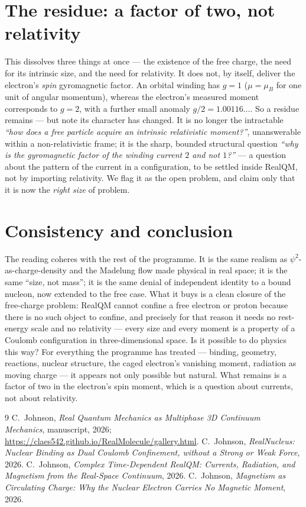 \documentclass[11pt]{article}
\begin{document}
\section{The residue: a factor of two, not relativity}
\label{sec:residue}

This dissolves three things at once --- the existence of the free charge, the need for its intrinsic size,
and the need for relativity. It does not, by itself, deliver the electron's \emph{spin} gyromagnetic
factor. An orbital winding has $g=1$ ($\mu = \mu_B$ for one unit of angular momentum), whereas the
electron's measured moment corresponds to $g=2$, with a further small anomaly $g/2 = 1.00116\ldots$. So a
residue remains --- but note its character has changed. It is no longer the intractable
\emph{``how does a free particle acquire an intrinsic relativistic moment?''}, unanswerable within a
non-relativistic frame; it is the sharp, bounded structural question \emph{``why is the gyromagnetic
factor of the winding current $2$ and not $1$?''} --- a question about the pattern of the current in a
configuration, to be settled inside RealQM, not by importing relativity. We flag it as the open problem,
and claim only that it is now the \emph{right size} of problem.

\section{Consistency and conclusion}
\label{sec:concl}

The reading coheres with the rest of the programme. It is the same realism as $\psi^2$-as-charge-density
and the Madelung flow made physical in real space; it is the same ``size, not mass''; it is the same
denial of independent identity to a bound nucleon, now extended to the free case. What it buys is a clean
closure of the free-charge problem: RealQM cannot confine a free electron or proton because there is no
such object to confine, and precisely for that reason it needs no rest-energy scale and no relativity ---
every size and every moment is a property of a Coulomb configuration in three-dimensional space. Is it
possible to do physics this way? For everything the programme has treated --- binding, geometry, reactions,
nuclear structure, the caged electron's vanishing moment, radiation as moving charge --- it appears not
only possible but natural. What remains is a factor of two in the electron's spin moment, which is a
question about currents, not about relativity.

\begin{thebibliography}{9}
 C.~Johnson, \emph{Real Quantum Mechanics as Multiphase 3D Continuum Mechanics},
manuscript, 2026; \url{https://claes542.github.io/RealMolecule/gallery.html}.
 C.~Johnson, \emph{RealNucleus: Nuclear Binding as Dual Coulomb Confinement, without
a Strong or Weak Force}, 2026.
 C.~Johnson, \emph{Complex Time-Dependent RealQM: Currents, Radiation, and
Magnetism from the Real-Space Continuum}, 2026.
 C.~Johnson, \emph{Magnetism as Circulating Charge: Why the Nuclear Electron
Carries No Magnetic Moment}, 2026.
\end{thebibliography}
\end{document}
